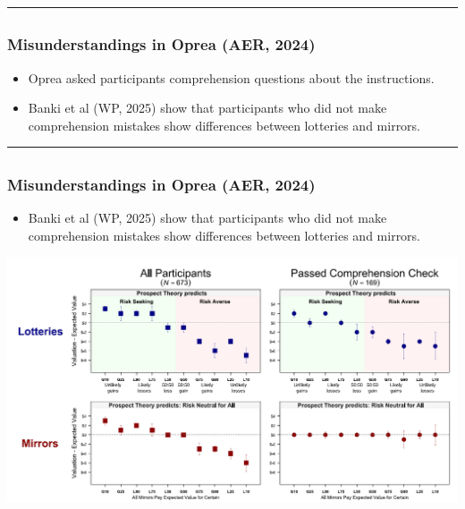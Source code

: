 \documentclass[
  letterpaper,
  DIV=11,
  numbers=noendperiod]{scrartcl}
\providecommand{\tightlist}{%
  \setlength{\itemsep}{0pt}\setlength{\parskip}{0pt}}\usepackage{longtable,booktabs,array}
\begin{document}
\begin{center}\rule{0.5\linewidth}{0.5pt}\end{center}

\subsection{}\label{section-2}

\subsubsection{Misunderstandings in Oprea (AER,
2024)}\label{misunderstandings-in-oprea-aer-2024}

\begin{itemize}
\tightlist
\item
  Oprea asked participants comprehension questions about the
  instructions.
\item
  Banki et al (WP, 2025) show that participants who did not make
  comprehension mistakes show differences between lotteries and mirrors.
\end{itemize}

\begin{center}\rule{0.5\linewidth}{0.5pt}\end{center}

\subsection{}\label{section-3}

\subsubsection{Misunderstandings in Oprea (AER,
2024)}\label{misunderstandings-in-oprea-aer-2024-1}

\begin{itemize}
\tightlist
\item
  Banki et al (WP, 2025) show that participants who did not make
  comprehension mistakes show differences between lotteries and mirrors.
\end{itemize}

\includegraphics[width=0.7\linewidth,height=\textheight,keepaspectratio]{figures/SimplicityEquivalentsComment.png}
\end{document}
